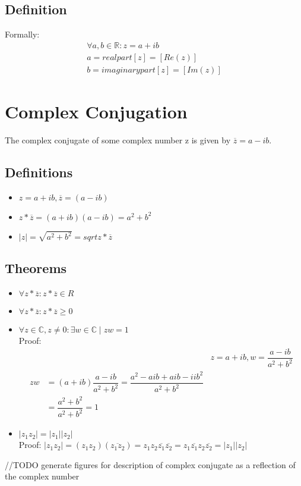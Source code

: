 	\subsection{Definition}
	
		Formally:
		\begin{align}
			\forall a,b \in \mathbb{R}: z = a+ib \\
			a = realpart[z] = [Re(z)]\\
			b = imaginarypart[z] = [Im(z)]
		\end{align}
		
\section{Complex Conjugation}

	The complex conjugate of some complex number z is given by $\overline{z} = a - ib$.

	\subsection{Definitions}
	
		\begin{itemize}
			\item $z = a + ib, \overline{z} = (a - ib)$
			\item $z*\overline{z} = (a+ib)(a-ib) = a^2 + b^2$
			\item $|z| = \sqrt{a^2 + b^2} = sqrt{z*\overline{z}}$
		\end{itemize}
		
	\subsection{Theorems}
	
		\begin{itemize}
			\item $\forall z*\overline{z}: z*\overline{z} \in R$
			\item $\forall z*\overline{z}: z*\overline{z} \geq 0$
			\item $\forall z \in \mathbb{C}, z \neq 0: \exists w \in \mathbb{C} \mid zw =1$ \\
					Proof:
					\begin{align}
						&& z = a + ib, w = \dfrac{a-ib}{a^2 + b^2} \\
						zw &= (a + ib)\dfrac{a-ib}{a^2 + b^2} = \dfrac{a^2 - aib + aib - iib^2}{a^2 + b^2} \\
							&= \dfrac{a^2 + b^2}{a^2 + b^2} = 1
					\end{align}
			\item $|z_1z_2| = |z_1||z_2|$\\
					Proof:
					$|z_1z_2| = (z_1z_2)(\overline{z_1z_2}) = z_1z_2\overline{z_1}\overline{z_2} = z_1\overline{z_1}z_2\overline{z_2} = |z_1||z_2|$
		\end{itemize}
		
	//TODO generate figures for description of complex conjugate as a reflection of the complex number
